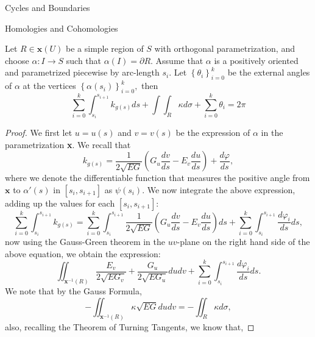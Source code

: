 \begin{subsubsection}{Cycles and Boundaries}
\begin{subsubsection}{Homologies and Cohomologies}
\begin{tcolorbox}
  \begin{theorem}
    Let $R\in\textbf{x}(U)$ be a simple region of $S$ with orthogonal
    parametrization, and choose $\alpha: I \rightarrow S$ such that
    $\alpha(I)=\partial R$. Assume that $\alpha$ is a positively oriented and
    parametrized piecewise by arc-length $s_i$. Let
    $\left\{\theta_i\right\}_{i=0}^k$ be the external angles of $\alpha$ at the
    vertices $\left\{\alpha(s_i)\right\}_{i=0}^k,$ then
    \begin{equation}
      \sum_{i=0}^k\int_{s_i}^{s_{i+1}}k_{g(s)}ds + \int\int_R \kappa d\sigma
      + \sum_{i=0}^k\theta_i = 2\pi
      \label{eq:gaussbonnetlocal}
    \end{equation}
  \end{theorem}
\end{tcolorbox}
\begin{proof}
  We first let $u=u(s)$ and $v=v(s)$ be the expression of $\alpha$ in the
  parametrization \textbf{x}. We recall that
  \begin{equation}
    k_{g(s)}
    = \frac{1}{2\sqrt{EG}}\left(G_u\frac{dv}{ds}-E_v\frac{du}{ds}\right)
    + \frac{d\varphi}{ds},
  \end{equation}
  where we  denote the differentiable function that measures the positive angle
  from $\textbf{x}$ to $\alpha'(s)$ in $\left[s_i,s_{i+1}\right]$ as
  $\psi(s_i)$. We now integrate the above expression, adding up the values
  for each $\left[s_i,s_{i+1}\right]$:
  \begin{equation}
     \sum_{i=0}^k\int_{s_i}^{s_{i+1}}k_{g(s)}
     = \sum_{i=0}^k\int_{s_i}^{s_{i+1}}\frac{1}{2\sqrt{EG}}\left(G_u\frac{dv}{ds}
       - E_v\frac{du}{ds}\right)ds
       + \sum_{i=0}^{k}\int_{s_i}^{s_{i+1}}\frac{d\varphi_i}{ds}ds,
  \end{equation}
  now using the  Gauss-Green theorem in the $uv$-plane on the right hand side
  of the above equation, we obtain the expression:
\begin{equation}
  \iint_{\textbf{x}^{-1}(R)}\frac{E_v}{2\sqrt{EG_v}}
  + \frac{G_u}{2\sqrt{EG_u}}dudv
    + \sum_{i=0}^{k}\int_{s_i}^{s_{i+1}}\frac{d\varphi_i}{ds}ds.
  \end{equation}
We note that by the Gauss Formula,
\begin{equation}
  -\iint_{\textbf{x}^{-1}(R)}\kappa\sqrt{EG}dudv = -\iint_R \kappa
  d\sigma,
\end{equation}
also, recalling the Theorem of Turning Tangents, we know that,

\end{proof}
\end{subsubsection}
\end{subsubsection}
